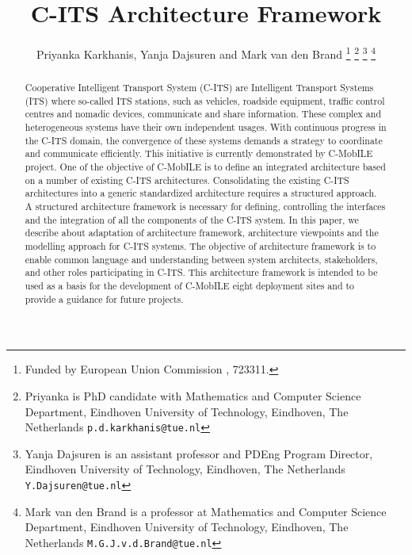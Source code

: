 \documentclass[letterpaper, 10 pt, conference]{ieeeconf}  %
\title{\LARGE \bf
C-ITS Architecture Framework
}
\author{Priyanka Karkhanis, Yanja Dajsuren and Mark van den Brand%
\thanks{Funded by European Union Commission , 723311.}%
\thanks{Priyanka is PhD candidate with Mathematics and Computer Science Department,
     Eindhoven University of Technology, Eindhoven, The Netherlands
        {\tt\small p.d.karkhanis@tue.nl}}%
\thanks{Yanja Dajsuren is an assistant professor and PDEng Program Director,
	 Eindhoven University of Technology, Eindhoven, The Netherlands
        {\tt\small Y.Dajsuren@tue.nl}}%
\thanks{Mark van den Brand is a professor at Mathematics and Computer Science Department,
  	 Eindhoven University of Technology, Eindhoven, The Netherlands
  	{\tt\small M.G.J.v.d.Brand@tue.nl}}%
}
\begin{document}
\maketitle
\thispagestyle{empty}
\pagestyle{empty}


\begin{abstract}

Cooperative Intelligent Transport System (C-ITS) are Intelligent Transport Systems (ITS) where so-called ITS stations, such as vehicles, roadside equipment, traffic control centres and nomadic devices, communicate and share information. These complex and heterogeneous systems have their own independent usages. With continuous progress in the C-ITS domain, the convergence of these systems demands a strategy to coordinate and communicate efficiently. This initiative is currently demonstrated by C-MobILE project. One of the objective of C-MobILE is to define an integrated architecture based on a number of existing C-ITS architectures. Consolidating the existing C-ITS architectures into a generic standardized architecture requires a structured approach. A structured architecture framework is necessary for defining, controlling the interfaces and the integration of all the components of the C-ITS system.
In this paper, we describe about adaptation of architecture framework, architecture viewpoints and the modelling approach for C-ITS systems. The objective of architecture framework is to enable common language and understanding between system architects, stakeholders, and other roles participating in C-ITS. This architecture framework is intended to be used as a basis for the development of C-MobILE eight deployment sites and to provide a guidance for future projects.

\end{abstract}


\end{document}
